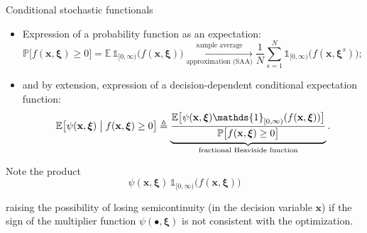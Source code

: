 \documentclass[aspectratio=169,xcolor=dvipsnames]{beamer}
\begin{document}
\begin{frame}{Conditional stochastic functionals}
  \small
  \setlength{\abovedisplayskip}{5pt}
  \setlength{\belowdisplayskip}{5pt}
  \setlength{\abovedisplayshortskip}{4pt}
  \setlength{\belowdisplayshortskip}{4pt}

  \begin{itemize}
    \setlength{\itemsep}{0.12cm}
    \item Expression of a probability function as an expectation:
      \[
        \mathbb{P}\bigl[f(\mathbf{x},\boldsymbol{\xi})\geq 0\bigr]
        =\mathbb{E}\,\mathds{1}_{[0,\infty)}
          \bigl(f(\mathbf{x},\boldsymbol{\xi})\bigr)
        \xrightarrow[\text{approximation (SAA)}]{\text{sample average}}
        \frac{1}{N}\sum_{s=1}^{N}\mathds{1}_{[0,\infty)}
          \bigl(f(\mathbf{x},\boldsymbol{\xi}^s)\bigr);
      \]
    \item and by extension, expression of a
      {\color{MediumBlue}decision-dependent conditional expectation
      function}:
      \[
        \mathbb{E}\bigl[\psi(\mathbf{x},\boldsymbol{\xi})\bigm|
          f(\mathbf{x},\boldsymbol{\xi})\geq 0\bigr]
        \triangleq
        \underbrace{\frac{\mathbb{E}\bigl[\psi(\mathbf{x},\boldsymbol{\xi})
            \mathds{1}_{[0,\infty)}
            (f(\mathbf{x},\boldsymbol{\xi}))\bigr]}
          {\mathbb{P}\bigl[f(\mathbf{x},\boldsymbol{\xi})\geq 0\bigr]}}_
          {\text{fractional Heaviside function}}.
      \]
  \end{itemize}

  \vspace{0.10cm}
  Note the product
  \vspace{-0.02cm}
  \[
    \psi(\mathbf{x},\boldsymbol{\xi})\,
    \mathds{1}_{[0,\infty)}\bigl(f(\mathbf{x},\boldsymbol{\xi})\bigr)
  \]

  raising the possibility of losing semicontinuity (in the decision variable
  $\mathbf{x}$) if the sign of the multiplier function
  $\psi(\bullet,\boldsymbol{\xi})$ is not consistent with the optimization.
\end{frame}
\end{document}
